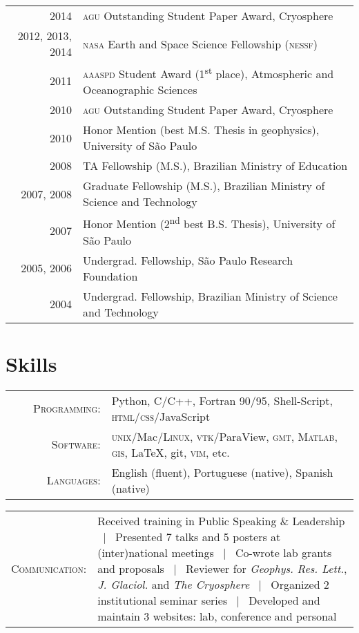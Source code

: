 \documentclass[a4paper,11pt]{article}
\begin{document}
\begin{tabular}{rl}
2014 & \textsc{agu} Outstanding Student Paper Award, Cryosphere\\
2012, 2013, 2014 & \textsc{nasa} Earth and Space Science Fellowship (\textsc{nessf})\\ 
2011 & \textsc{aaaspd} Student Award (1\textsuperscript{st} place), Atmospheric and Oceanographic Sciences\\
2010 & \textsc{agu} Outstanding Student Paper Award, Cryosphere\\
2010 & Honor Mention (best M.S. Thesis in geophysics), University of S\~ao Paulo\\
2008 & TA Fellowship (M.S.), Brazilian Ministry of Education\\
2007, 2008 & Graduate Fellowship (M.S.), Brazilian Ministry of Science and Technology\\
2007 & Honor Mention (2\textsuperscript{nd} best B.S. Thesis), University of S\~ao Paulo\\
2005, 2006 & Undergrad. Fellowship, S\~ao Paulo Research Foundation\\
2004 & Undergrad. Fellowship, Brazilian Ministry of Science and Technology
\end{tabular}


\section{Skills}

\begin{tabular}{rl}
\textsc{~~~~Programming:} & Python, C/C++, Fortran 90/95, Shell-Script, \textsc{html}/\textsc{css}/JavaScript\\
\textsc{Software:} & \textsc{unix}/Mac/\textsc{Linux}, \textsc{vtk}/ParaView, \textsc{gmt}, \textsc{Matlab}, \textsc{gis}, \LaTeX, git, \textsc{vim}, etc.\\
\textsc{Languages:} & English (fluent), Portuguese (native), Spanish (native)
\end{tabular}

\begin{tabular}{rp{12.4cm}}
\textsc{Communication:} & {\small Received training in Public Speaking \& Leadership ~|~ Presented 7 talks and 5 posters at (inter)national meetings ~|~ Co-wrote lab grants and proposals ~|~ Reviewer for {\it Geophys. Res. Lett.}, {\it J. Glaciol.} and {\it The Cryosphere} ~|~ Organized 2 institutional seminar series ~|~ Developed and maintain 3 websites: lab, conference and personal}
\end{tabular}
\end{document}
